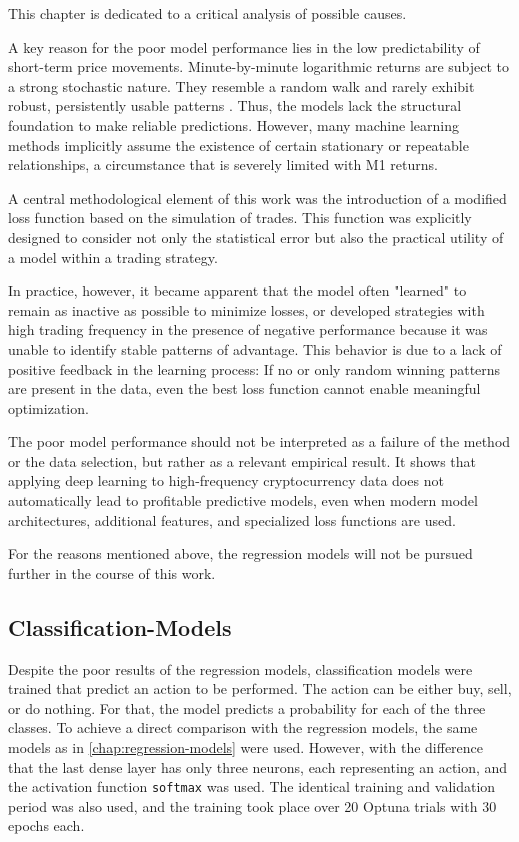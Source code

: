 This chapter is dedicated to a critical analysis of possible causes.

A key reason for the poor model performance lies in the low predictability of short-term price movements.
Minute-by-minute logarithmic returns are subject to a strong stochastic nature.
They resemble a random walk and rarely exhibit robust, persistently usable patterns \cite{random-walk}.
Thus, the models lack the structural foundation to make reliable predictions.
However, many machine learning methods implicitly assume the existence of certain stationary or repeatable relationships, a circumstance that is severely limited with M1 returns.

A central methodological element of this work was the introduction of a modified loss function based on the simulation of trades.
This function was explicitly designed to consider not only the statistical error but also the practical utility of a model within a trading strategy.

In practice, however, it became apparent that the model often "learned" to remain as inactive as possible to minimize losses, or developed strategies with high trading frequency in the presence of negative performance because it was unable to identify stable patterns of advantage.
This behavior is due to a lack of positive feedback in the learning process: If no or only random winning patterns are present in the data, even the best loss function cannot enable meaningful optimization.

The poor model performance should not be interpreted as a failure of the method or the data selection, but rather as a relevant empirical result.
It shows that applying deep learning to high-frequency cryptocurrency data does not automatically lead to profitable predictive models, even when modern model architectures, additional features, and specialized loss functions are used.

For the reasons mentioned above, the regression models will not be pursued further in the course of this work.

\subsection{Classification-Models}
\label{chap:classification-models}

Despite the poor results of the regression models, classification models were trained that predict an action to be performed.
The action can be either buy, sell, or do nothing.
For that, the model predicts a probability for each of the three classes.
To achieve a direct comparison with the regression models, the same models as in \autoref{chap:regression-models} were used.
However, with the difference that the last dense layer has only three neurons, each representing an action, and the activation function \verb|softmax| was used.
The identical training and validation period was also used, and the training took place over 20 Optuna trials with 30 epochs each.

